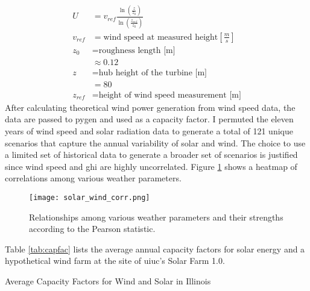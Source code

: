 \begin{align}
  U &= v_{ref}\frac{\ln\left(\frac{z}{z_0}\right)}{\ln\left(\frac{z_{ref}}{z_0}\right)}\\
  v_{ref} &= \text{wind speed at measured height$\left[\frac{m}{s}\right]$}\nonumber\\
  z_0 &= \text{roughness length [m]}\nonumber\\
  &\approx 0.12\nonumber\\
  z &= \text{hub height of the turbine [m]}\nonumber\\
  &=80\nonumber\\
  z_{ref} &= \text{height of wind speed measurement [m]}\nonumber
\end{align}
After calculating theoretical wind power generation from wind speed data, the
data are passed to \gls{pygen} and used as a capacity factor. I permuted the
eleven years of wind speed and solar radiation data to generate a total of 121
unique scenarios that capture the annual variability of solar and wind. The
choice to use a limited set of historical data to generate a broader set of
scenarios is justified since wind speed and \gls{ghi} are highly uncorrelated.
Figure \ref{fig:solar-wind-corr} shows a heatmap of correlations among various
weather parameters.

\begin{figure}[H]
  \centering
  \texttt{[image: solar\_wind\_corr.png]}
  \caption{Relationships among various weather parameters and their strengths
  according to the Pearson statistic.}
  \label{fig:solar-wind-corr}
\end{figure}

Table \ref{tab:capfac} lists the average annual capacity factors for solar energy
and a hypothetical wind farm at the site of \gls{uiuc}'s Solar Farm 1.0.

\begin{table}[H]
  \centering
  \caption{Average Capacity Factors for Wind and Solar in Illinois}
  \label{tab:capfac}
  
\end{table}
